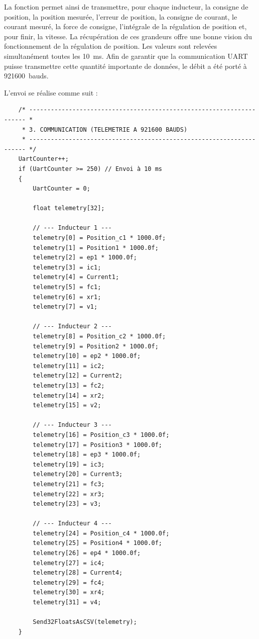 La fonction permet ainsi de transmettre, pour chaque inducteur, la consigne de position, la position mesurée, l'erreur de position, la consigne de courant, le courant mesuré, la force de consigne, l'intégrale de la régulation de position et, pour finir, la vitesse. La récupération de ces grandeurs offre une bonne vision du fonctionnement de la régulation de position. Les valeurs sont relevées simultanément toutes les 10~ms. Afin de garantir que la communication UART puisse transmettre cette quantité importante de données, le débit a été porté à 921600~bauds.

L'envoi se réalise comme suit :

\begin{verbatim}
    /* --------------------------------------------------------------------- *
     * 3. COMMUNICATION (TELEMETRIE A 921600 BAUDS)
     * --------------------------------------------------------------------- */
    UartCounter++;
    if (UartCounter >= 250) // Envoi à 10 ms
    {
        UartCounter = 0;

        float telemetry[32];

        // --- Inducteur 1 ---
        telemetry[0] = Position_c1 * 1000.0f;
        telemetry[1] = Position1 * 1000.0f;
        telemetry[2] = ep1 * 1000.0f;
        telemetry[3] = ic1;
        telemetry[4] = Current1;
        telemetry[5] = fc1;
        telemetry[6] = xr1;
        telemetry[7] = v1;

        // --- Inducteur 2 ---
        telemetry[8] = Position_c2 * 1000.0f;
        telemetry[9] = Position2 * 1000.0f;
        telemetry[10] = ep2 * 1000.0f;
        telemetry[11] = ic2;
        telemetry[12] = Current2;
        telemetry[13] = fc2;
        telemetry[14] = xr2;
        telemetry[15] = v2;

        // --- Inducteur 3 ---
        telemetry[16] = Position_c3 * 1000.0f;
        telemetry[17] = Position3 * 1000.0f;
        telemetry[18] = ep3 * 1000.0f;
        telemetry[19] = ic3;
        telemetry[20] = Current3;
        telemetry[21] = fc3;
        telemetry[22] = xr3;
        telemetry[23] = v3;

        // --- Inducteur 4 ---
        telemetry[24] = Position_c4 * 1000.0f;
        telemetry[25] = Position4 * 1000.0f;
        telemetry[26] = ep4 * 1000.0f;
        telemetry[27] = ic4;
        telemetry[28] = Current4;
        telemetry[29] = fc4;
        telemetry[30] = xr4;
        telemetry[31] = v4;

        Send32FloatsAsCSV(telemetry);
    }
\end{verbatim}

